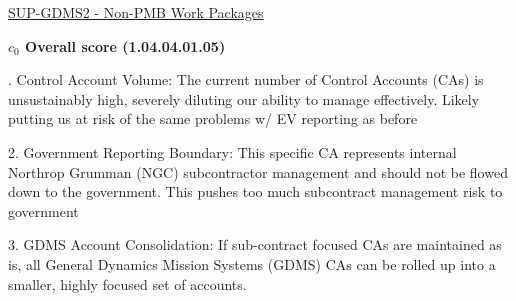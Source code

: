 % 


\begin{frame}{\href{run:../local/source-docs/1.04.04.01.05.pdf}{SUP-GDMS2 - Non-PMB Work Packages}}
\centering
{}
\par
\vspace{0.75em}
\textbf{\small{\(c_0\) Overall score {\tiny (1.04.04.01.05)}}}\\\par
\vspace{0.5em}
\begin{minipage}{0.85\textwidth}
\raggedright
\fontsize{7}{9}. Control Account Volume: The current number of Control Accounts (CAs) is unsustainably high, severely diluting our ability to manage effectively. Likely putting us at risk of the same problems w/ EV reporting as before\par\vspace{0.5em}2. Government Reporting Boundary: This specific CA represents internal Northrop Grumman (NGC) subcontractor management and should not be flowed down to the government. This pushes too much subcontract management risk to government\par\vspace{0.5em}3. GDMS Account Consolidation: If sub-contract focused CAs are maintained as is, all General Dynamics Mission Systems (GDMS) CAs can be rolled up into a smaller, highly focused set of accounts.\par
\end{minipage}
\end{frame}
%
